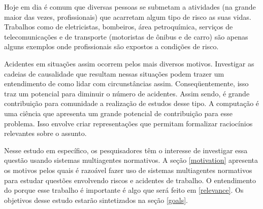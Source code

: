 Hoje em dia é comum que diversas pessoas se submetam a atividades (na grande maior das vezes, profissionais) que acarretam algum tipo de risco as suas vidas. Trabalhos como de eletricistas, bombeiros, área petroquímica, serviços de telecomunicações e de transporte (motoristas de ônibus e de carro) são apenas alguns exemplos onde profissionais são expostos a condições de risco.

Acidentes em situações assim ocorrem pelos mais diversos motivos. Investigar as cadeias de causalidade que resultam nessas situações podem trazer um entendimento de como lidar com circunstâncias assim. Conseqüentemente, isso traz um potencial para diminuir o número de acidentes. Assim sendo, é grande contribuição para comunidade a realização de estudos desse tipo. A computação é uma ciência que apresenta um grande potencial de contribuição para esse problema. Isso envolve criar representações que permitam formalizar raciocínios relevantes sobre o assunto.

Nesse estudo em específico, os pesquisadores têm o interesse de investigar essa questão usando sistemas multiagentes normativos. A seção \ref{motivation} apresenta os motivos pelos quais é razoável fazer uso de sistemas multiagentes normativos para estudar questões envolvendo riscos e acidentes de trabalho. O entendimento do porque esse trabalho é importante é algo que será feito em \ref{relevance}. Os objetivos desse estudo estarão sintetizados na seção \ref{goals}.